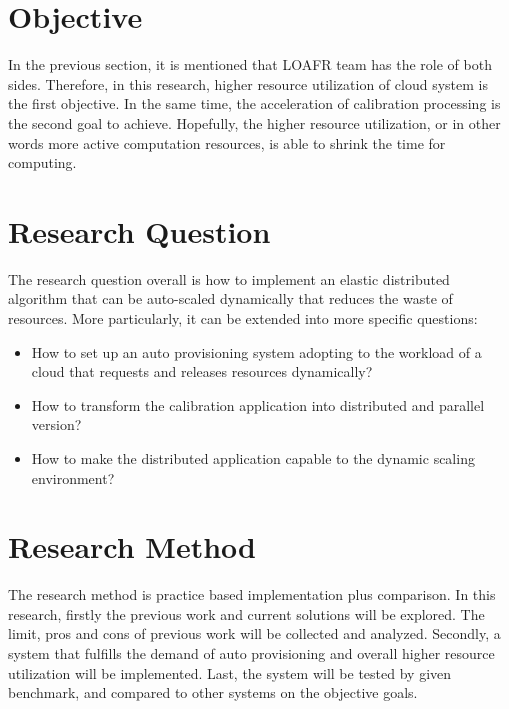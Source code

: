 \section{Objective}

In the previous section, it is mentioned that LOAFR team has the role of both sides. Therefore, in this research, higher resource utilization of cloud system is the first objective.
In the same time, the acceleration of calibration processing is the second goal to achieve. Hopefully, the higher resource utilization, or in other words more active computation resources, is able to shrink the time for computing.

\section{Research Question}
The research question overall is how to implement an elastic distributed algorithm that can be auto-scaled dynamically that reduces the waste of resources.
More particularly, it can be extended into more specific questions:
\begin{itemize}
  \item How to set up an auto provisioning system adopting to the workload of a cloud that requests and releases resources dynamically?
  \item How to transform the calibration application into distributed and parallel version?
  \item How to make the distributed application capable to the dynamic scaling environment?
\end{itemize}


\section{Research Method}
The research method is practice based implementation plus comparison. 
In this research, firstly the previous work and current solutions will be explored. The limit, pros and cons of previous work will be collected and analyzed.
Secondly, a system that fulfills the demand of auto provisioning and overall higher resource utilization will be implemented.
Last, the system will be tested by given benchmark, and compared to other systems on the objective goals.

 
